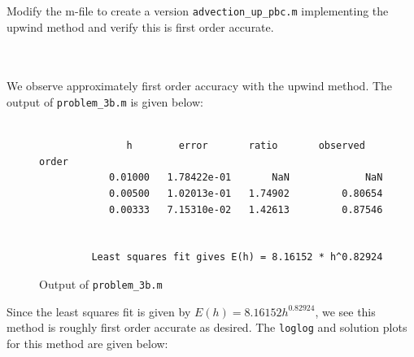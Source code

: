 Modify the m-file to create a version \texttt{advection\_up\_pbc.m} implementing the upwind method and verify this is
first order accurate.

\begin{solution}\ \\\\
    We observe approximately first order accuracy with the upwind method. The output of \texttt{problem\_3b.m} is
    given below: \ \\\\

    \begin{figure}[h]
        \begin{verbatim}
               h        error       ratio       observed order
            0.01000   1.78422e-01       NaN             NaN
            0.00500   1.02013e-01   1.74902         0.80654
            0.00333   7.15310e-02   1.42613         0.87546
          
          
         Least squares fit gives E(h) = 8.16152 * h^0.82924
        \end{verbatim}
        \caption{Output of \texttt{problem\_3b.m}}
    \end{figure}

    Since the least squares fit is given by $E(h) = 8.16152 h^{0.82924}$, we see this method is roughly first order 
    accurate as desired. The \texttt{loglog} and solution plots for this method are given below:


\end{solution}
